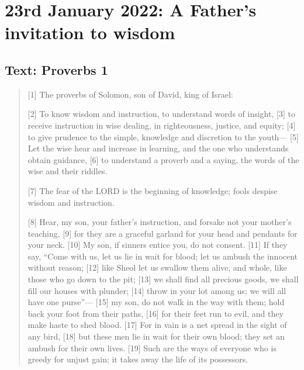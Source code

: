 \section{23rd January 2022: A Father's invitation to wisdom}
\subsection*{Text: Proverbs 1}
  \begin{quote}
    [1] The proverbs of Solomon, son of David, king of Israel:

    [2] To know wisdom and instruction,
        to understand words of insight,
    [3] to receive instruction in wise dealing,
        in righteousness, justice, and equity;
    [4] to give prudence to the simple,
        knowledge and discretion to the youth—
    [5] Let the wise hear and increase in learning,
        and the one who understands obtain guidance,
    [6] to understand a proverb and a saying,
        the words of the wise and their riddles.


    [7] The fear of the LORD is the beginning of knowledge;
        fools despise wisdom and instruction.


        [8] Hear, my son, your father’s instruction,
        and forsake not your mother’s teaching,
    [9] for they are a graceful garland for your head
        and pendants for your neck.
    [10] My son, if sinners entice you,
        do not consent.
    [11] If they say, “Come with us, let us lie in wait for blood;
        let us ambush the innocent without reason;
    [12] like Sheol let us swallow them alive,
        and whole, like those who go down to the pit;
    [13] we shall find all precious goods,
        we shall fill our houses with plunder;
    [14] throw in your lot among us;
        we will all have one purse”—
    [15] my son, do not walk in the way with them;
        hold back your foot from their paths,
    [16] for their feet run to evil,
        and they make haste to shed blood.
    [17] For in vain is a net spread
        in the sight of any bird,
    [18] but these men lie in wait for their own blood;
        they set an ambush for their own lives.
    [19] Such are the ways of everyone who is greedy for unjust gain;
        it takes away the life of its possessors.



\end{quote}
